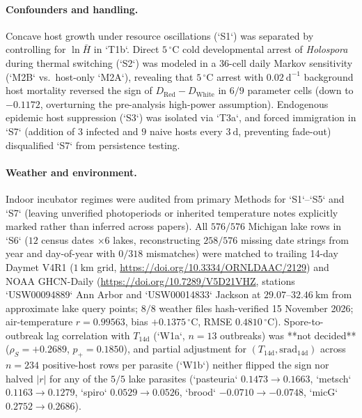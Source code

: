 \paragraph{Confounders and handling.}
Concave host growth under resource oscillations (`S1`) was separated by controlling for $\ln\bar{H}$ in `T1b`. Direct $5\,^{\circ}\mathrm{C}$ cold developmental arrest of \textit{Holospora} during thermal switching (`S2`) was modeled in a 36-cell daily Markov sensitivity (`M2B` vs.\ host-only `M2A`), revealing that $5\,^{\circ}\mathrm{C}$ arrest with $0.02\ \mathrm{d}^{-1}$ background host mortality reversed the sign of $D_{\mathrm{Red}} - D_{\mathrm{White}}$ in $6/9$ parameter cells (down to $-0.1172$, overturning the pre-analysis high-power assumption). Endogenous epidemic host suppression (`S3`) was isolated via `T3a`, and forced immigration in `S7` (addition of $3$ infected and $9$ naive hosts every $3\ \mathrm{d}$, preventing fade-out) disqualified `S7` from persistence testing.

\paragraph{Weather and environment.}
Indoor incubator regimes were audited from primary Methods for `S1`--`S5` and `S7` (leaving unverified photoperiods or inherited temperature notes explicitly marked rather than inferred across papers). All $576/576$ Michigan lake rows in `S6` ($12$ census dates $\times 6$ lakes, reconstructing $258/576$ missing date strings from year and day-of-year with $0/318$ mismatches) were matched to trailing 14-day Daymet V4R1 ($1\ \mathrm{km}$ grid, \url{https://doi.org/10.3334/ORNLDAAC/2129}) and NOAA GHCN-Daily (\url{https://doi.org/10.7289/V5D21VHZ}, stations `USW00094889` Ann Arbor and `USW00014833` Jackson at $29.07$--$32.46\ \mathrm{km}$ from approximate lake query points; $8/8$ weather files hash-verified 15 November 2026; air-temperature $r = 0.99563$, bias $+0.1375\,^{\circ}\mathrm{C}$, RMSE $0.4810\,^{\circ}\mathrm{C}$). Spore-to-outbreak lag correlation with $T_{14\mathrm{d}}$ (`W1a`, $n = 13$ outbreaks) was **not decided** ($\rho_S = +0.2689$, $p_+ = 0.1850$), and partial adjustment for $(T_{14\mathrm{d}}, \mathrm{srad}_{14\mathrm{d}})$ across $n = 234$ positive-host rows per parasite (`W1b`) neither flipped the sign nor halved $|r|$ for any of the $5/5$ lake parasites (`pasteuria` $0.1473 \to 0.1663$, `metsch` $0.1163 \to 0.1279$, `spiro` $0.0529 \to 0.0526$, `brood` $-0.0710 \to -0.0748$, `micG` $0.2752 \to 0.2686$).

